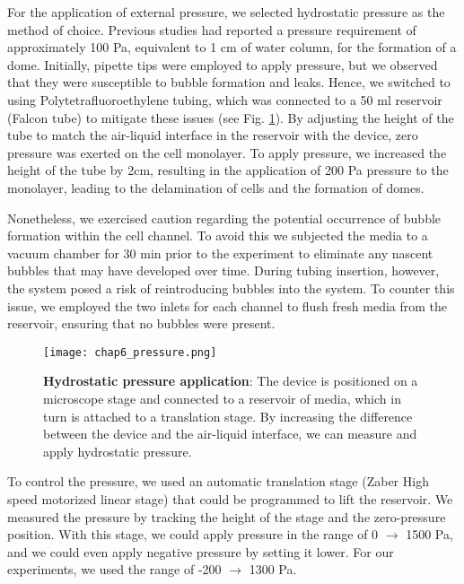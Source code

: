 For the application of external pressure, we selected hydrostatic pressure as the method of choice. Previous studies had reported a pressure requirement of approximately 100 \unit{\pascal}, equivalent to 1 \unit{\cm} of water column, for the formation of a dome. Initially, pipette tips were employed to apply pressure, but we observed that they were susceptible to bubble formation and leaks. Hence, we switched to using Polytetrafluoroethylene tubing, which was connected to a 50 \unit{\ml} reservoir (Falcon tube) to mitigate these issues (see Fig. \ref{fig_6_3}). By adjusting the height of the tube to match the air-liquid interface in the reservoir with the device, zero pressure was exerted on the cell monolayer. To apply pressure, we increased the height of the tube by 2\unit{\cm}, resulting in the application of 200 \unit{\pascal} pressure to the monolayer, leading to the delamination of cells and the formation of domes.

Nonetheless, we exercised caution regarding the potential occurrence of bubble formation within the cell channel. To avoid this we subjected the media to a vacuum chamber for 30 \unit{\minute} prior to the experiment to eliminate any nascent bubbles that may have developed over time. During tubing insertion, however, the system posed a risk of reintroducing bubbles into the system. To counter this issue, we employed the two inlets for each channel to flush fresh media from the reservoir, ensuring that no bubbles were present.

\begin{figure}[h!]
	\centering
	\texttt{[image: chap6\_pressure.png]}
	\caption{\textbf{Hydrostatic pressure application}: The device is positioned on a microscope stage and connected to a reservoir of media, which in turn is attached to a translation stage. By increasing the difference between the device and the air-liquid interface, we can measure and apply hydrostatic pressure.	} \label{fig_6_3}
\end{figure}

To control the pressure, we used an automatic translation stage (Zaber High speed motorized linear stage) that could be programmed to lift the reservoir. We measured the pressure by tracking the height of the stage and the zero-pressure position. With this stage, we could apply pressure in the range of 0 $\rightarrow$ 1500 \unit{\pascal}, and we could even apply negative pressure by setting it lower. For our experiments, we used the range of -200 $\rightarrow$ 1300 \unit{\pascal}.

